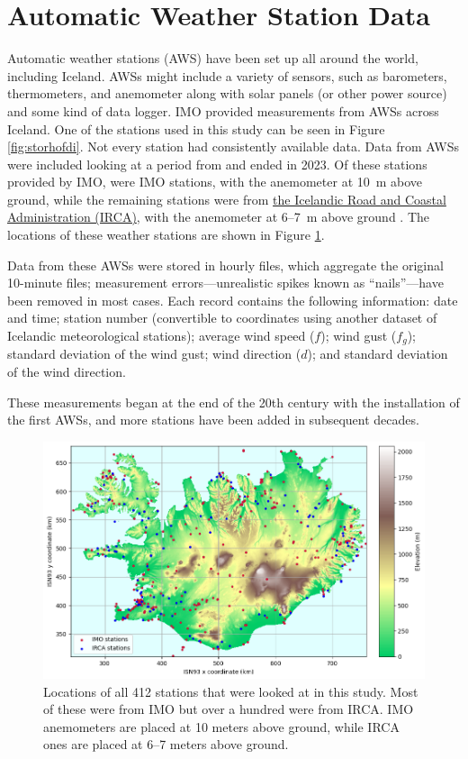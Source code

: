 \section{Automatic Weather Station Data}
Automatic weather stations (AWS) have been set up all around the world, including Iceland. AWSs might include a variety of sensors, such as barometers, thermometers, and anemometer along with solar panels (or other power source) and some kind of data logger. IMO provided measurements from AWSs across Iceland. One of the stations used in this study can be seen in Figure \ref{fig:storhofdi}. Not every station had consistently available data. Data from \nStationsMin AWSs were included looking at a period from \startDateVedur and ended in 2023. Of these \nStationsMin stations provided by IMO, \nVedurMin were IMO stations, with the anemometer at 10~m above ground, while the remaining \nVGMin stations were from \href{https://www.vegagerdin.is/}{the Icelandic Road and Coastal Administration (IRCA)}, with the anemometer at 6–7~m above ground \cite{vegagerdin_postur}. The locations of these weather stations are shown in Figure \ref{fig:aws_map}.

Data from these AWSs were stored in hourly files, which aggregate the original 10-minute files; measurement errors—unrealistic spikes known as “nails”—have been removed in most cases. Each record contains the following information: date and time; station number (convertible to coordinates using another dataset of Icelandic meteorological stations); average wind speed ($f$); wind gust ($f_g$); standard deviation of the wind gust; wind direction ($d$); and standard deviation of the wind direction.

These measurements began at the end of the 20th century with the installation of the first AWSs, and more stations have been added in subsequent decades.

\begin{figure}
    \centering
    \includegraphics[scale = 0.6]{Figures/station_elevations.png}
    \caption[Locations of automatic weather stations in Iceland]{Locations of all 412 stations that were looked at in this study. Most of these were from IMO but over a hundred were from IRCA. IMO anemometers are placed at 10 meters above ground, while IRCA ones are placed at 6--7 meters above ground.}
    \label{fig:aws_map}
\end{figure}


